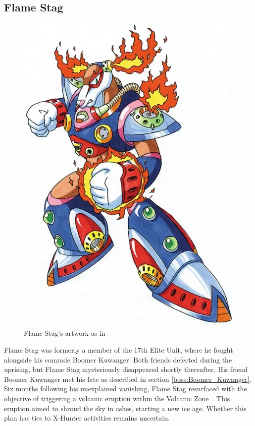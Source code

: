 \subsection{Flame Stag}\label{boss:Flame_stag}
\begin{figure}[htp]
	\centering
	\includegraphics[height=\portraitsize]{figures/X2/Flame_stag/Flame_Stag.png}
	\caption{Flame Stag's artwork as in \cite{book:MMX_Complete_art}}
\end{figure}
Flame Stag was formerly a member of the 17th Elite Unit, where he fought alongside his comrade Boomer Kuwanger. Both friends defected during the uprising, but Flame Stag mysteriously disappeared shortly thereafter. His friend Boomer Kuwanger met his fate as described in section \ref{boss:Boomer_Kuwanger}. Six months following his unexplained vanishing, Flame Stag resurfaced with the objective of triggering a volcanic eruption within the Volcanic Zone~\cite{wayback:X2_resources,wiki:Flame_stag}. This eruption aimed to shroud the sky in ashes, starting a new ice age. Whether this plan has ties to X-Hunter activities remains uncertain.

